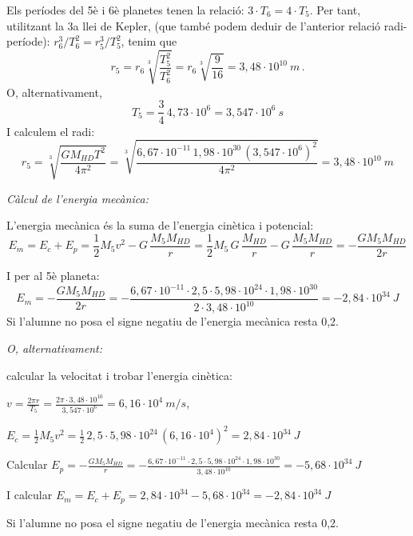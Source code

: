 \begin{solapartat}
 Els períodes del 5è i 6è planetes tenen la relació: $3\cdot T_6 = 4\cdot T_5$. Per tant, utilitzant la 3a llei de Kepler, (que també podem deduir de l'anterior relació radi-període): $r_6^3/T_6^2 = r_5^3/T_5^2$, tenim que
\[ r_5 = r_6\sqrt[3]{\frac{T_5^2}{T_6^2}} = r_6\sqrt[3]{\frac{9}{16}} = 3,48\cdot 10^{10}\ m\,. \]
O, alternativament,
\[ T_5 = \frac{3}{4}\,4,73\cdot 10^{6} = 3,547\cdot 10^{6}\ s \]
I calculem el radi:
\[ r_5 = \sqrt[3]{\frac{G M_{HD} T^2}{4\pi^2}} = \sqrt[3]{\frac{6,67\cdot 10^{-11}\,1,98\cdot 10^{30}\,(3,547\cdot 10^{6})^2}{4\pi^2}} = 3,48\cdot 10^{10}\ m \]

\textit{Càlcul de l'energia mecànica:}

 L'energia mecànica és la suma de l'energia cinètica i potencial:
\[ E_m = E_c + E_p = \frac{1}{2}M_5 v^2 - G\,\frac{M_5 M_{HD}}{r} = \frac{1}{2}M_5\,G\,\frac{M_{HD}}{r} - G\,\frac{M_5 M_{HD}}{r} = -\frac{G M_5 M_{HD}}{2r} \]

 I per al 5è planeta:
\[ E_m = -\frac{G M_5 M_{HD}}{2r} = -\frac{6,67\cdot 10^{-11}\cdot 2,5\cdot 5,98\cdot 10^{24}\cdot 1,98\cdot 10^{30}}{2\cdot 3,48\cdot 10^{10}} = -2,84\cdot 10^{34}\ J \]
Si l'alumne no posa el signe negatiu de l'energia mecànica resta 0,2.

\textit{O, alternativament:}

calcular la velocitat i trobar l'energia cinètica:

 $v = \frac{2\pi r}{T_5} = \frac{2\pi\cdot 3,48\cdot 10^{10}}{3,547\cdot 10^{6}} = 6,16\cdot 10^{4}\ m/s$,

 $E_c = \frac{1}{2}M_5 v^2 = \frac{1}{2}\,2,5\cdot 5,98\cdot 10^{24}\,(6,16\cdot 10^{4})^2 = 2,84\cdot 10^{34}\ J$

 Calcular $E_p = -\frac{G M_5 M_{HD}}{r} = -\frac{6,67\cdot 10^{-11}\cdot 2,5\cdot 5,98\cdot 10^{24}\cdot 1,98\cdot 10^{30}}{3,48\cdot 10^{10}} = -5,68\cdot 10^{34}\ J$

 I calcular $E_m = E_c + E_p = 2,84\cdot 10^{34} - 5,68\cdot 10^{34} = -2,84\cdot 10^{34}\ J$

Si l'alumne no posa el signe negatiu de l'energia mecànica resta 0,2.
\end{solapartat}
